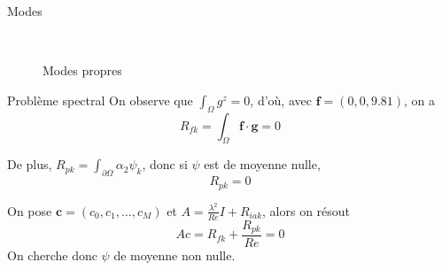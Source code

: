 \documentclass{beamer}
\begin{document}
\begin{frame}{Modes}
\begin{figure}[H]
{		\ 
	}
	\caption{Modes propres}
	\label{resultats}
\end{figure}
\end{frame}

\begin{frame}{Problème spectral}
On observe que $\int_\Omega g^z = 0$, d'où, avec $\bm{f}=(0,0,9.81)$, on a
\[ R_{fk}=\int_\Omega \bm{f}\cdot\bm{g}=0 \]

De plus, $R_{pk}=\int_{\partial\Omega} \alpha_2\psi_k$, donc si $\psi$ est de moyenne nulle,
\[ R_{pk}=0 \]

On pose $\bm{c} = (c_0,c_1,\dots,c_M)$ et $A=\frac{\lambda^2}{Re}I+R_{iak}$, alors on résout
\[ Ac = R_{fk}+\frac{R_{pk}}{Re} = 0 \]
On cherche donc $\psi$ de moyenne non nulle.
\end{frame}
\end{document}
